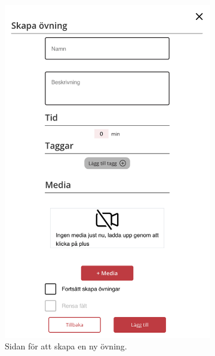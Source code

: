 \documentclass{article}
\begin{document}
{\begin{figure}[h!]
{\begin{subfigure}[b]{0.3\textwidth}
                 \includegraphics[width=\textwidth]{images/Screens/ExerciseCreate.png}
                 \caption{Sidan för att skapa en ny övning.}
                 \label{fig:exerciseCreate}
            \end{subfigure}
            \hfill
            \begin{subfigure}[b]{0.3\textwidth}
                 \centering

\end{subfigure}}
\end{figure}}
\end{document}
